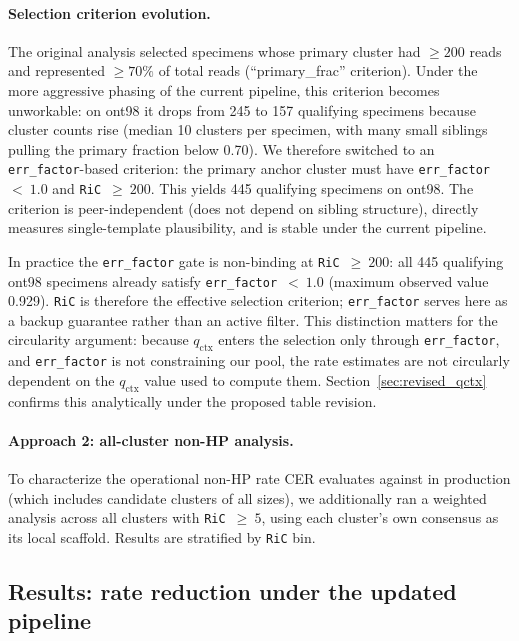 \documentclass[11pt]{article}
\begin{document}
\paragraph{Selection criterion evolution.} The original analysis selected
specimens whose primary cluster had $\geq 200$ reads and represented
$\geq 70\%$ of total reads (``primary\_frac'' criterion). Under the more
aggressive phasing of the current pipeline, this criterion becomes unworkable:
on ont98 it drops from 245 to 157 qualifying specimens because cluster
counts rise (median 10 clusters per specimen, with many small siblings
pulling the primary fraction below 0.70). We therefore switched to an
\texttt{err\_factor}-based criterion: the primary anchor cluster must have
\texttt{err\_factor}~$<~1.0$ and \texttt{RiC}~$\geq~200$. This yields 445
qualifying specimens on ont98. The criterion is peer-independent (does not
depend on sibling structure), directly measures single-template plausibility,
and is stable under the current pipeline.

In practice the \texttt{err\_factor} gate is non-binding at
\texttt{RiC}~$\geq~200$: all 445 qualifying ont98 specimens already
satisfy \texttt{err\_factor}~$<~1.0$ (maximum observed value 0.929).
\texttt{RiC} is therefore the effective selection criterion;
\texttt{err\_factor} serves here as a backup guarantee rather than an
active filter. This distinction matters for the circularity argument:
because $q_\text{ctx}$ enters the selection only through
\texttt{err\_factor}, and \texttt{err\_factor} is not constraining our pool,
the rate estimates are not circularly dependent on the $q_\text{ctx}$ value
used to compute them. Section~\ref{sec:revised_qctx} confirms this
analytically under the proposed table revision.

\paragraph{Approach 2: all-cluster non-HP analysis.} To characterize the
operational non-HP rate CER evaluates against in production (which includes
candidate clusters of all sizes), we additionally ran a weighted analysis
across all clusters with \texttt{RiC}~$\geq~5$, using each cluster's own
consensus as its local scaffold. Results are stratified by \texttt{RiC} bin.

\subsection{Results: rate reduction under the updated pipeline}
\end{document}
